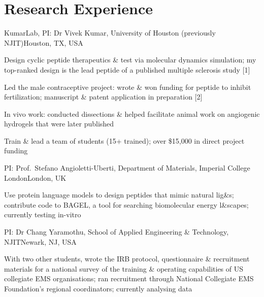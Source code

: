 \documentclass[a4paper,11pt]{article}  %
\begin{document}
\section{Research Experience}
      {KumarLab, PI: Dr Vivek Kumar, University of Houston (previously NJIT)}{Houston, TX, USA}
\begin{cvitems}
  \item Design cyclic peptide therapeutics \& test via molecular dynamics simulation; my top-ranked design is the lead peptide of a published multiple sclerosis study [1]
  \item Led the male contraceptive project: wrote \& won funding for peptide to inhibit fertilization; manuscript \& patent application in preparation [2]
  \item In vivo work: conducted dissections \& helped facilitate animal work on angiogenic hydrogels that were later published
  \item Train \& lead a team of students (15+ trained); over \$15,000 in direct project funding
\end{cvitems}

      {PI: Prof.\ Stefano Angioletti-Uberti, Department of Materials, Imperial College London}{London, UK}
\begin{cvitems}
  \item Use protein language models to design peptides that mimic natural lig\&s; contribute code to BAGEL, a tool for searching biomolecular energy l\&scapes; currently testing in-vitro
\end{cvitems}

      {PI: Dr Chang Yaramothu, School of Applied Engineering \& Technology, NJIT}{Newark, NJ, USA}
\begin{cvitems}
  \item With two other students, wrote the IRB protocol, questionnaire \& recruitment materials for a national survey of the training \& operating capabilities of US collegiate EMS organisations; ran recruitment through National Collegiate EMS Foundation's regional coordinators; currently analysing data
\end{cvitems}
\end{document}

